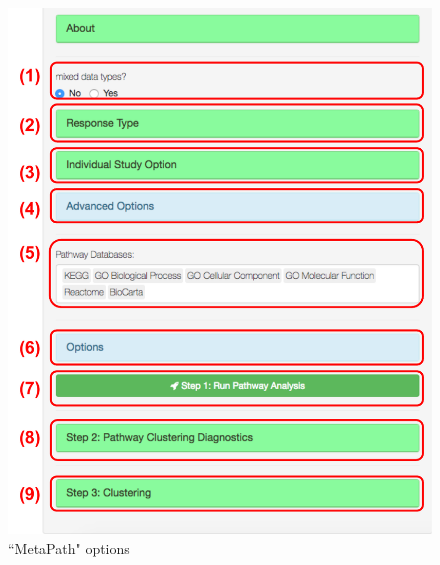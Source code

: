 \begin{figure}[H]
\begin{center}
\includegraphics[scale=0.45]{./figure/metaPath/metaPathoption.pdf}
\caption{``MetaPath" options}
\label{fig:MetaPathoption}
\end{center}
\end{figure}

